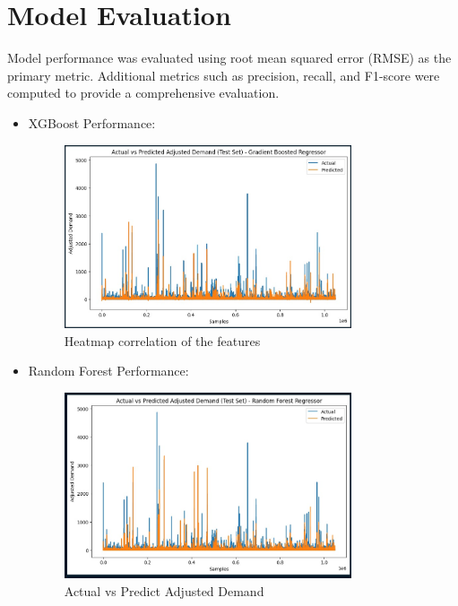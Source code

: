 \documentclass{article}
\begin{document}
\section{Model Evaluation}
Model performance was evaluated using root mean squared error (RMSE) as the primary metric. Additional metrics such as precision, recall, and F1-score were computed to provide a comprehensive evaluation.
\begin{itemize}
    \item XGBoost Performance:
  
    \begin{figure}[H] 
        \begin{center}
        \centering
        \includegraphics[width=0.8\textwidth]{images/comparisonxg.jpg}
        \caption{Heatmap correlation of the features}
        \end{center}
    \end{figure} 

    \item Random Forest Performance:
    
    \begin{figure}[H] 
        \begin{center}
        \centering
        \includegraphics[width=0.8\textwidth]{images/comparison.jpg}
        \caption{Actual vs Predict Adjusted Demand}
        \end{center}
    \end{figure} 

\end{itemize}
\end{document}
